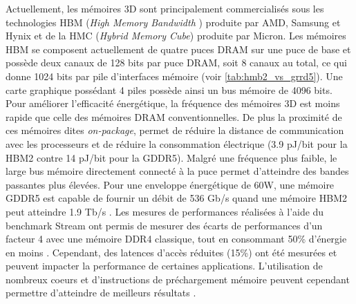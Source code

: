         
        Actuellement, les mémoires 3D sont principalement commercialisés sous les technologies HBM (\textit{High Memory Bandwidth} \cite{Standard2013}) produite par AMD, Samsung et Hynix et de la HMC (\textit{Hybrid Memory Cube}\cite{Jeddeloh2012}) produite par Micron. Les mémoires HBM se composent actuellement de quatre puces DRAM sur une puce de base et possède deux canaux de 128 bits par puce DRAM, soit 8 canaux au total, ce qui donne 1024 bits par pile d'interfaces mémoire (voir \autoref{tab:hmb2_vs_grrd5}). Une carte graphique possédant 4 piles possède ainsi un bus mémoire de 4096 bits. Pour améliorer l'efficacité énergétique, la fréquence des mémoires 3D est moins rapide que celle des mémoires DRAM conventionnelles. De plus la proximité de ces mémoires dites \textit{on-package}, permet de réduire la distance de communication avec les processeurs et de réduire la consommation électrique (3.9 pJ/bit pour la HBM2 contre 14 pJ/bit pour la GDDR5). Malgré une fréquence plus faible, le large bus mémoire directement connecté à la puce permet d'atteindre des bandes passantes plus élevées. Pour une enveloppe énergétique de 60W, une mémoire GDDR5 est capable de fournir un débit de 536 Gb/s quand une mémoire HBM2 peut atteindre 1.9 Tb/s \cite{OConnor2017}. Les mesures de performances réalisées à l'aide du benchmark Stream ont permis de mesurer des écarts de performances d'un facteur 4 avec une mémoire DDR4 classique\cite{7965110}, tout en consommant 50\% d'énergie en moins . Cependant, des latences d'accès réduites (15\%) ont été mesurées et peuvent impacter la performance de certaines applications. L'utilisation de nombreux coeurs et d'instructions de préchargement mémoire peuvent cependant permettre d'atteindre de meilleurs résultats \cite{7965110}.
        
        \begin{table}[]
        \centering
        \caption{Comparaison des mémoires GDDR5 utilisées sur les GPU NVidia K80 et des mémoires HBM2 utilisées sur un GPU utilisant 4 piles de mémoire.}
        \label{tab:hmb2_vs_grrd5}
        \end{table}
         

